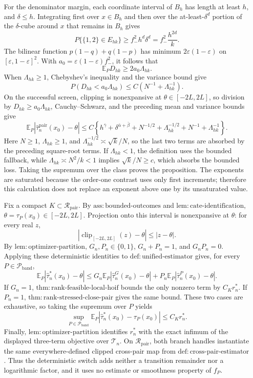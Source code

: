 For the denominator margin, each coordinate interval of \(B_h\) has length at least \(h\), and \(\delta\leq h\).  Integrating first over \(x\in B_h\) and then over the at-least-\(\delta^d\) portion of the \(\delta\)-cube around \(x\) that remains in \(B_h\) gives
\[
 P\{\{1,2\}\in E_{hk}\}\geq f_-^2h^d\delta^d=f_-^2\frac{h^{2d}}{k}.
\]
The bilinear function \(p(1-q)+q(1-p)\) has minimum \(2\varepsilon(1-\varepsilon)\) on \([\varepsilon,1-\varepsilon]^2\).  With \(a_0=\varepsilon(1-\varepsilon)f_-^2\), it follows that
\[
 \mathbb E_PD_{hk}\geq2a_0\Lambda_{hk}.
\]
When \(\Lambda_{hk}\geq1\), Chebyshev's inequality and the variance bound give
\[
 P(D_{hk}<a_0\Lambda_{hk})
 \leq C\left(N^{-1}+\Lambda_{hk}^{-1}\right).
\]
On the successful screen, clipping is nonexpansive at \(\theta\in[-2L,2L]\), so division by \(D_{hk}\geq a_0\Lambda_{hk}\), Cauchy--Schwarz, and the preceding mean and variance bounds give
\[
 \mathbb E_P|\widehat\tau_n^{\mathrm{pair}}(x_0)-\theta|
 \leq C\left\{h^{\bar\gamma}+\delta^{\bar\alpha+\bar\beta}
 +N^{-1/2}+\Lambda_{hk}^{-1/2}
 +N^{-1}+\Lambda_{hk}^{-1}\right\}.
\]
Here \(N\geq1\), \(\Lambda_{hk}\geq1\), and \(\Lambda_{hk}^{-1/2}\asymp\sqrt{k}/N\), so the last two terms are absorbed by the preceding square-root terms.  If \(\Lambda_{hk}<1\), the definition uses the bounded fallback, while \(\Lambda_{hk}\asymp N^2/k<1\) implies \(\sqrt{k}/N\geq c\), which absorbs the bounded loss.  Taking the supremum over the class proves the proposition.  The exponents are saturated because the order-one contrast uses only first increments; therefore this calculation does not replace an exponent above one by its unsaturated value.

Fix a compact \(K\subset\mathcal R_{\mathrm{pair}}\).  By \(\mathrm{ass:bounded\mbox{-}outcomes}\) and \(\mathrm{lem:cate\mbox{-}identification}\), \(\theta=\tau_P(x_0)\in[-2L,2L]\).  Projection onto this interval is nonexpansive at \(\theta\): for every real \(z\),
\[
 |\operatorname{clip}_{[-2L,2L]}(z)-\theta|\leq|z-\theta|.
\]
By \(\mathrm{lem:optimizer\mbox{-}partition}\), \(G_n,P_n\in\{0,1\}\), \(G_n+P_n=1\), and \(G_nP_n=0\).  Applying these deterministic identities to \(\mathrm{def:unified\mbox{-}estimator}\) gives, for every \(P\in\mathcal P_{\mathrm{band}}\),
\[
 \mathbb E_P|\widehat\tau_n^*(x_0)-\theta|
 \leq G_n\mathbb E_P|\widehat\tau_n^G(x_0)-\theta|
 +P_n\mathbb E_P|\widehat\tau_n^P(x_0)-\theta|.
\]
If \(G_n=1\), \(\mathrm{thm:rank\mbox{-}feasible\mbox{-}local\mbox{-}hoif}\) bounds the only nonzero term by \(C_Kr_n^*\).  If \(P_n=1\), \(\mathrm{thm:rank\mbox{-}stressed\mbox{-}close\mbox{-}pair}\) gives the same bound.  These two cases are exhaustive, so taking the supremum over \(P\) yields
\[
 \sup_{P\in\mathcal P_{\mathrm{band}}}
 \mathbb E_P|\widehat\tau_n^*(x_0)-\tau_P(x_0)|\leq C_Kr_n^*.
\]
Finally, \(\mathrm{lem:optimizer\mbox{-}partition}\) identifies \(r_n^*\) with the exact infimum of the displayed three-term objective over \(\mathcal T_n\).  On \(\mathcal R_{\mathrm{pair}}\), both branch handles instantiate the same everywhere-defined clipped cross-pair map from \(\mathrm{def:cross\mbox{-}pair\mbox{-}estimator}\).  Thus the deterministic switch adds neither a transition remainder nor a logarithmic factor, and it uses no estimate or smoothness property of \(f_P\).
